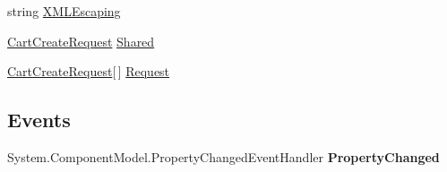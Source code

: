 \begin{DoxyCompactItemize}
\begin{DoxyCompactList}\small\item\em \end{DoxyCompactList}\item 
\hypertarget{class_price___comparison_1_1amazon_1_1ecs_1_1_cart_create_a546c795e1d1f4a9331837a21ceba0721}{string \hyperlink{class_price___comparison_1_1amazon_1_1ecs_1_1_cart_create_a546c795e1d1f4a9331837a21ceba0721}{X\-M\-L\-Escaping}}\label{class_price___comparison_1_1amazon_1_1ecs_1_1_cart_create_a546c795e1d1f4a9331837a21ceba0721}

\begin{DoxyCompactList}\small\item\em \end{DoxyCompactList}\item 
\hypertarget{class_price___comparison_1_1amazon_1_1ecs_1_1_cart_create_a10ea7095b43675c0be10c80275e1917c}{\hyperlink{class_price___comparison_1_1amazon_1_1ecs_1_1_cart_create_request}{Cart\-Create\-Request} \hyperlink{class_price___comparison_1_1amazon_1_1ecs_1_1_cart_create_a10ea7095b43675c0be10c80275e1917c}{Shared}}\label{class_price___comparison_1_1amazon_1_1ecs_1_1_cart_create_a10ea7095b43675c0be10c80275e1917c}

\begin{DoxyCompactList}\small\item\em \end{DoxyCompactList}\item 
\hypertarget{class_price___comparison_1_1amazon_1_1ecs_1_1_cart_create_a38e8325a3fda83dbac78bd29a693e109}{\hyperlink{class_price___comparison_1_1amazon_1_1ecs_1_1_cart_create_request}{Cart\-Create\-Request}\mbox{[}$\,$\mbox{]} \hyperlink{class_price___comparison_1_1amazon_1_1ecs_1_1_cart_create_a38e8325a3fda83dbac78bd29a693e109}{Request}}\label{class_price___comparison_1_1amazon_1_1ecs_1_1_cart_create_a38e8325a3fda83dbac78bd29a693e109}

\begin{DoxyCompactList}\small\item\em \end{DoxyCompactList}\end{DoxyCompactItemize}
\subsection*{Events}
\begin{DoxyCompactItemize}
\item 
\hypertarget{class_price___comparison_1_1amazon_1_1ecs_1_1_cart_create_a88666da570aad99cf79b96f64a161abd}{System.\-Component\-Model.\-Property\-Changed\-Event\-Handler {\bfseries Property\-Changed}}\label{class_price___comparison_1_1amazon_1_1ecs_1_1_cart_create_a88666da570aad99cf79b96f64a161abd}

\end{DoxyCompactItemize}
